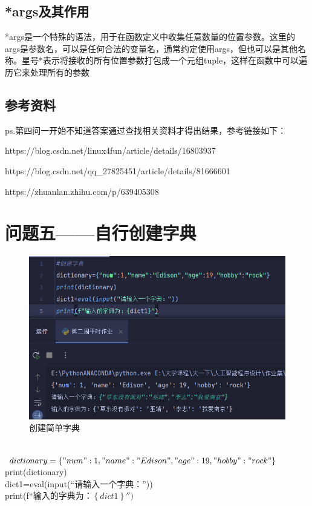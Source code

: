 \documentclass[10pt]{article}
\begin{document}
		\subsection{*args及其作用}
		*args是一个特殊的语法，用于在函数定义中收集任意数量的位置参数。这里的args是参数名，可以是任何合法的变量名，通常约定使用args，但也可以是其他名称。星号*表示将接收的所有位置参数打包成一个元组tuple，这样在函数中可以遍历它来处理所有的参数
		\subsection{参考资料}
		ps.第四问一开始不知道答案通过查找相关资料才得出结果，参考链接如下：\par
		https://blog.csdn.net/linux4fun/article/details/16803937\par
		https://blog.csdn.net/qq\_27825451/article/details/81666601\par
		https://zhuanlan.zhihu.com/p/639405308
\section{问题五——自行创建字典}
		\begin{figure}[H]
			\centering
			\includegraphics[scale=0.6]{创建简单字典}
			\caption{创建简单字典}
		\end{figure}
		\\
		$dictionary=\left\{"num":1,"name":"Edison","age":19,"hobby":"rock" \right\} \\$
		print(dictionary)\\
		dict1=eval(input(``请输入一个字典：''))\\
	    print(f``输入的字典为：$\left\{dict1\right\}'')$
		
\end{document}
